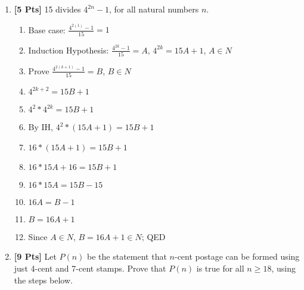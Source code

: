 \begin{enumerate}
        \item {\bf [5 Pts]} 15 divides $4^{2n}-1$, for all natural numbers $n$.
        \begin{enumerate}
            \item Base case: $\frac{4^{2(1)} - 1}{15} = 1$
            \item Induction Hypothesis: $\frac{4^{2k} - 1}{15} = A$, $4^{2k} = 15A + 1$, $A \in N$
            \item Prove $\frac{4^{2(k + 1)} - 1}{15} = B$, $B \in N$
            \item $4^{2k + 2} = 15B + 1$
            \item $4^2*4^{2k} = 15B + 1$
            \item By IH, $4^2*(15A + 1) = 15B + 1$
            \item $16*(15A + 1) = 15B + 1$
            \item $16*15A + 16 = 15B + 1$
            \item $16*15A = 15B - 15$
            \item $16A = B - 1$
            \item $B = 16A + 1$
            \item Since $A \in N$, $B = 16A + 1 \in N$; QED
        \end{enumerate}

        \item {\bf [9 Pts]} Let $P(n)$ be the statement that $n$-cent postage can be formed using just
        4-cent and 7-cent stamps. Prove that $P(n)$ is true for all $n \geq 18$, using the steps below.

        \begin{enumerate}


\end{enumerate}
\end{enumerate}
